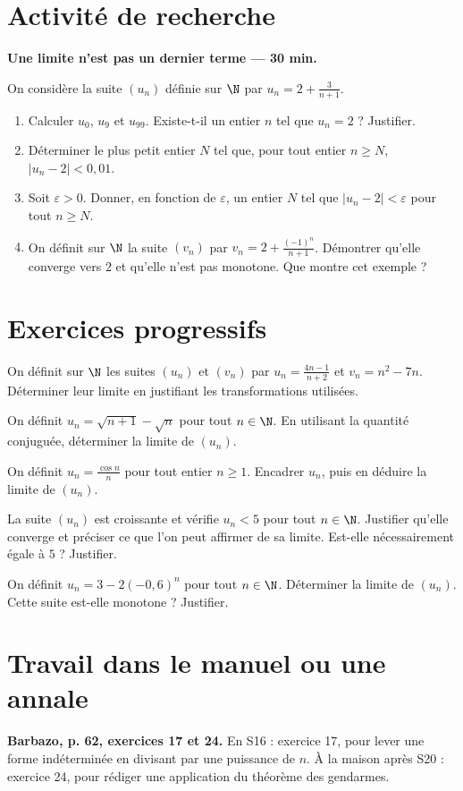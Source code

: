 \section{Activité de recherche}\textbf{Une limite n'est pas un dernier terme --- 30 min.}\par On considère la suite $(u_n)$ définie sur $\N$ par $u_n=2+\frac3{n+1}$.
\begin{enumerate}\item Calculer $u_0$, $u_9$ et $u_{99}$. Existe-t-il un entier $n$ tel que $u_n=2$ ? Justifier.
\item Déterminer le plus petit entier $N$ tel que, pour tout entier $n\ge N$, $|u_n-2|<0{,}01$.
\item Soit $\varepsilon>0$. Donner, en fonction de $\varepsilon$, un entier $N$ tel que $|u_n-2|<\varepsilon$ pour tout $n\ge N$.
\item On définit sur $\N$ la suite $(v_n)$ par $v_n=2+\frac{(-1)^n}{n+1}$. Démontrer qu'elle converge vers $2$ et qu'elle n'est pas monotone. Que montre cet exemple ?\end{enumerate}

\section{Exercices progressifs}

On définit sur $\N$ les suites $(u_n)$ et $(v_n)$ par $u_n=\frac{4n-1}{n+2}$ et $v_n=n^2-7n$. Déterminer leur limite en justifiant les transformations utilisées.

On définit $u_n=\sqrt{n+1}-\sqrt n$ pour tout $n\in\N$. En utilisant la quantité conjuguée, déterminer la limite de $(u_n)$.

On définit $u_n=\frac{\cos n}{n}$ pour tout entier $n\ge1$. Encadrer $u_n$, puis en déduire la limite de $(u_n)$.

La suite $(u_n)$ est croissante et vérifie $u_n<5$ pour tout $n\in\N$. Justifier qu'elle converge et préciser ce que l'on peut affirmer de sa limite. Est-elle nécessairement égale à $5$ ? Justifier.

On définit $u_n=3-2(-0{,}6)^n$ pour tout $n\in\N$. Déterminer la limite de $(u_n)$. Cette suite est-elle monotone ? Justifier.

\section{Travail dans le manuel ou une annale}\textbf{Barbazo, p. 62, exercices 17 et 24.} En S16 : exercice 17, pour lever une forme indéterminée en divisant par une puissance de $n$. À la maison après S20 : exercice 24, pour rédiger une application du théorème des gendarmes.

